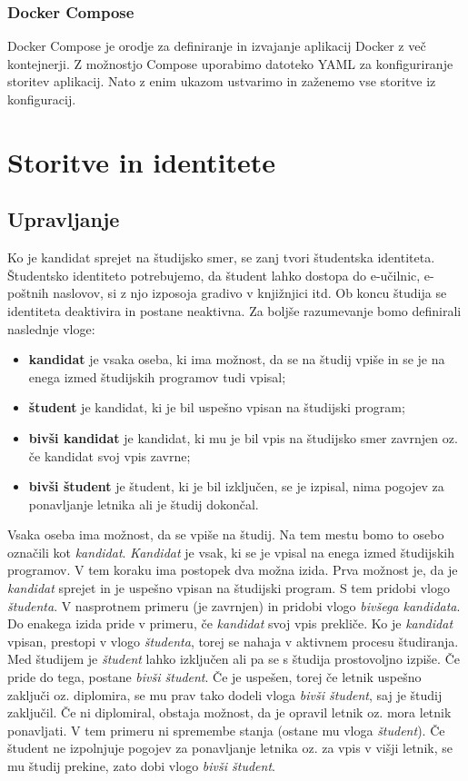 \documentclass[a4paper,12pt,openright,oneside]{book}
\begin{document}
\subsection{Docker Compose}
\label{Docker}
Docker Compose \cite{dockerComposeLink} je orodje za definiranje in izvajanje aplikacij Docker z več kontejnerji. Z možnostjo Compose uporabimo datoteko YAML za konfiguriranje storitev aplikacij. Nato z enim ukazom ustvarimo in zaženemo vse storitve iz konfiguracij.

\chapter{Storitve in identitete}
\section{Upravljanje}
Ko je kandidat sprejet na študijsko smer, se zanj tvori študentska identiteta. Študentsko identiteto potrebujemo, da študent lahko dostopa do e-učilnic, e-poštnih naslovov, si z njo izposoja gradivo v knjižnjici itd. Ob koncu študija se identiteta deaktivira in postane neaktivna. 
Za boljše razumevanje bomo definirali naslednje vloge:
\begin{itemize}
    \item \textbf{kandidat} je vsaka oseba, ki ima možnost, da se na študij vpiše in se je na enega izmed študijskih programov tudi vpisal;
    \item \textbf{študent} je kandidat, ki je bil uspešno vpisan na študijski program;
    \item \textbf{bivši kandidat} je kandidat, ki mu je bil vpis na študijsko smer zavrnjen oz. če kandidat svoj vpis zavrne;
    \item \textbf{bivši študent} je študent, ki je bil izključen, se je izpisal, nima pogojev za ponavljanje letnika ali je študij dokončal.
\end{itemize}
Vsaka oseba ima možnost, da se vpiše na študij. Na tem mestu bomo to osebo označili kot \emph{kandidat}. \emph{Kandidat}  je vsak, ki se je vpisal na enega izmed študijskih programov. V tem koraku ima postopek dva možna izida. Prva možnost je, da je \emph{kandidat} sprejet in je uspešno vpisan na študijski program. S tem pridobi vlogo \emph{študenta}. V nasprotnem primeru (je zavrnjen) in pridobi vlogo \emph{bivšega kandidata}. Do enakega izida pride v primeru, če \emph{kandidat} svoj vpis prekliče. \newline
Ko je \emph{kandidat} vpisan, prestopi v vlogo \emph{študenta}, torej se nahaja v aktivnem procesu študiranja. Med študijem je \emph{študent} lahko izključen ali pa se s študija prostovoljno izpiše. Če pride do tega, postane \emph{bivši študent}. Če je uspešen, torej če letnik uspešno zaključi oz. diplomira, se mu prav tako dodeli vloga \emph{bivši študent}, saj je študij zaključil. Če ni diplomiral, obstaja možnost, da je opravil letnik oz. mora letnik ponavljati. V tem primeru ni spremembe stanja (ostane mu vloga \emph{študent}). Če študent ne izpolnjuje pogojev za ponavljanje letnika oz. za vpis v višji letnik, se mu študij prekine, zato dobi vlogo \emph{bivši študent}.
\end{document}
